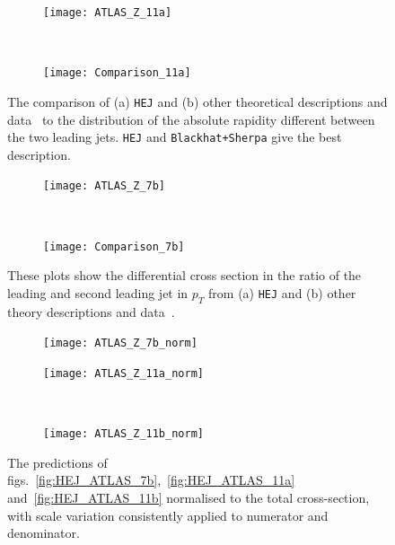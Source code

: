 		\begin{figure}[H]
		  \centering
		  \begin{subfigure}[b]{0.48\textwidth}
		    \texttt{[image: ATLAS\_Z\_11a]}
		    \caption{}
		    \label{fig:HEJ_ATLAS_11a}
		  \end{subfigure}
		  ~
		  \begin{subfigure}[b]{0.48\textwidth}
		    \texttt{[image: Comparison\_11a]}
		    \caption{}
		    \label{fig:MC_ATLAS_11a}
		  \end{subfigure}
		  \caption{The comparison of (a) \texttt{HEJ} and (b) other theoretical descriptions and
		    data~\cite{Aad:2013ysa} to
		    the distribution of the absolute rapidity different between the two leading
		    jets.  \texttt{HEJ} and \texttt{Blackhat+Sherpa} give the best description.}
		  \label{fig:ATLAS_11a}

		  \begin{subfigure}[b]{0.48\textwidth}
		    \texttt{[image: ATLAS\_Z\_7b]}
		    \caption{}
		    \label{fig:HEJ_ATLAS_7b}
		  \end{subfigure}
		  ~
		  \begin{subfigure}[b]{0.48\textwidth}
		    \texttt{[image: Comparison\_7b]}
		    \caption{}
		    \label{fig:MC_ATLAS_7b}
		  \end{subfigure}
		  \caption{These plots show the differential cross section in the ratio of the leading
		     and second leading jet in $p_T$ from (a) \texttt{HEJ} and (b) other
		    theory descriptions and data~\cite{Aad:2013ysa}.}
		  \label{fig:ATLAS_7b}
		\end{figure}

		\begin{figure}[H]

			\centering

			\begin{subfigure}[b]{0.48\textwidth}
			  \texttt{[image: ATLAS\_Z\_7b\_norm]}
			  \vspace{0.2cm}
			  \caption{}
			  \label{fig:ATLAS_Z_7b_norm}
			\end{subfigure}

			\begin{subfigure}[b]{0.48\textwidth}
			  \texttt{[image: ATLAS\_Z\_11a\_norm]}
			  \vspace{0.2cm}
			  \caption{}
			  \label{fig:ATLAS_Z_11a_norm}
			\end{subfigure}
			~
			\begin{subfigure}[b]{0.48\textwidth}
			  \texttt{[image: ATLAS\_Z\_11b\_norm]}
			  \caption{}
			  \label{fig:ATLAS_Z_11b_norm}
			\end{subfigure}
			\caption{The predictions of figs.~\eqref{fig:HEJ_ATLAS_7b},~\eqref{fig:HEJ_ATLAS_11a} and~\eqref{fig:HEJ_ATLAS_11b}
			normalised to the total cross-section, with scale variation consistently applied to numerator and denominator.}

			\label{fig:ATLAS_norm}
		\end{figure}

